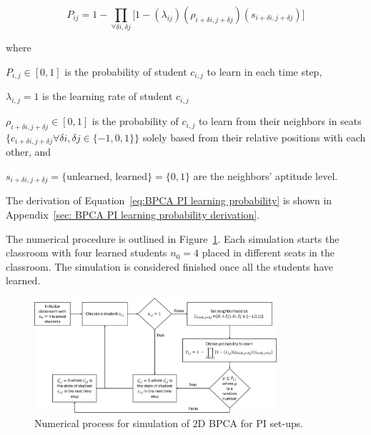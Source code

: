 \begin{equation}
    \label{eq:BPCA PI learning probability}
        P_{ij} = 1 - \prod_{\forall \delta i, \delta j}{\lbrack1-(\lambda_{ij})(\rho_{i+\delta i, j+\delta j})(s_{i+\delta i, j+\delta j})}\rbrack
\end{equation}

where

$P_{i,j} \in [0,1]$ is the probability of student $c_{i,j}$ to learn in each time step, 

$\lambda_{i,j} = 1$ is the learning rate of student $c_{i,j}$

$\rho_{i+\delta i, j+\delta j} \in [0,1]$ is the probability of $c_{i,j}$ to learn from their neighbors in seats $\lbrace c_{i+\delta i, j+\delta j} \forall \delta i, \delta j \in \lbrace -1,0,1 \rbrace \rbrace$ solely based from their relative positions with each other, and

$s_{i+\delta i, j+\delta j} = \lbrace\text{unlearned, learned}\rbrace=\lbrace 0,1 \rbrace$ are the neighbors' aptitude level.

The derivation of Equation~\ref{eq:BPCA PI learning probability} is shown in Appendix~\ref{sec: BPCA PI learning probability derivation}.

The numerical procedure is outlined in Figure~\ref{fig:2DBPCA PI Flowchart}. 
Each simulation starts the classroom with four learned students $n_0 = 4$ placed in different seats in the classroom. 
The simulation is considered finished once all the students have learned.

\begin{figure}[htbp!]
    \centering
    \includegraphics[width=0.8\textwidth]{figures/2DBPCA PI Flowchart.png}
    \caption[Peer instruction simulation flowchart]{Numerical process for simulation of 2D BPCA for PI set-ups.}
    \label{fig:2DBPCA PI Flowchart}
\end{figure}

